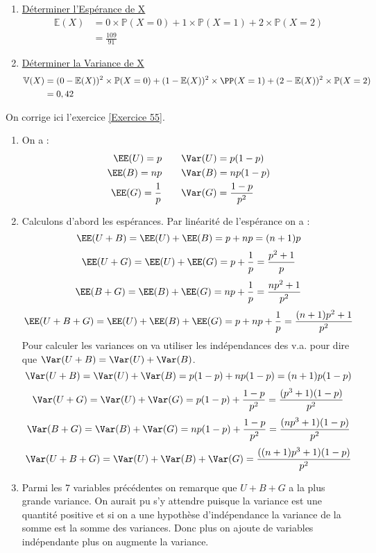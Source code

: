 \documentclass[12pt,fleqn]{report} %
\begin{document}
\begin{correction}
\begin{enumerate}
		\item \underline{Déterminer l'Espérance de X}
		\begin{align*}
		\mathbb{E}(X) & = 0\times \mathbb{P}(X=0)+ 1\times \mathbb{P}(X=1) + 2 \times \mathbb{P} (X=2)\\
		& = \frac{109}{91}
		\end{align*}
		
		
		\item \underline{Déterminer la Variance de X}
		\begin{align*}
		\mathbb{V}(X) & = (0-\mathbb{E}(X))^2\times \mathbb{P}(X=0) + (1- \mathbb{E}(X))^2 \times \PP(X=1) + (2 - \mathbb{E}(X))^2 \times \mathbb{P}(X=2)\\
		& = 0,42
		\end{align*}
		
	\end{enumerate}
\end{correction}


\begin{correction}
	On corrige ici l'exercice \ref{Exercice 55}. \begin{enumerate}
		\item On a : \begin{align*}
		\EE(U) = p &  \qquad\Var(U) = p(1-p) \\ \EE(B) = np &\qquad \Var(B) = np(1-p) \\
		\EE(G) = \frac{1}{p} &\qquad \Var(G) = \frac{1-p}{p^2}
		\end{align*}
		
		\item Calculons d'abord les espérances. Par linéarité de l'espérance on a : \[
		\EE(U + B) = \EE(U) + \EE(B) = p + np = (n+1)p
		\]
		\[
		\EE(U+G) = \EE(U) + \EE(G) = p + \frac{1}{p} = \frac{p^2 + 1}{p}
		\]
		\[
		\EE(B+G) = \EE(B) + \EE(G) = np + \frac{1}{p} = \frac{np^2 + 1}{p^2}
		\]
		\[
		\EE(U + B+ G) = \EE(U) + \EE(B) + \EE(G) = p + np + \frac{1}{p} = \frac{(n+1)p^2 + 1}{p^2}
		\]
		Pour calculer les variances on va utiliser les indépendances des v.a. pour dire que $\Var(U + B) = \Var(U) + \Var(B)$.
		\[
		\Var(U +B) = \Var(U) + \Var(B) = p(1-p) + np(1-p) = (n+1)p(1-p)
		\]
		\[
		\Var(U+G) = \Var(U) + \Var(G) = p(1-p) + \frac{1-p}{p^2} = \frac{(p^3 + 1)(1-p)}{p^2}
		\]
		\[
		\Var(B+G) = \Var(B) + \Var(G) = np(1-p) + \frac{1-p}{p^2} = \frac{(np^3+1)(1-p)}{p^2}
		\]
		\[
		\Var(U + B + G) = \Var(U) +\Var(B) + \Var(G) = \frac{((n+1)p^3 +1)(1-p)}{p^2}
		\]
		\item Parmi les 7 variables précédentes on remarque que $U+B+G$ a la plus grande variance. On aurait pu s'y attendre puisque la variance est une quantité positive et si on a une hypothèse d'indépendance la variance de la somme est la somme des variances. Donc plus on ajoute de variables indépendante plus on augmente la variance.
	\end{enumerate}
\end{correction}
\end{document}
